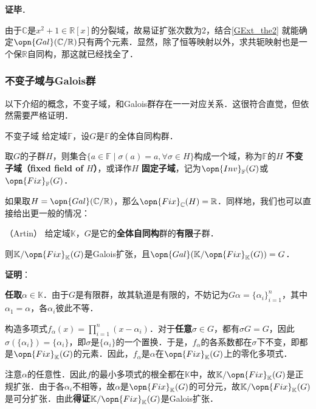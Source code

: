\textbf{证毕}．



由于$\mathbb{C}$是$x^2+1\in\mathbb{R}[x]$的分裂域，故易证扩张次数为$2$，结合\autoref{GExt_the2} 就能确定$\opn{Gal}(\mathbb{C}/\mathbb{R})$只有两个元素．显然，除了恒等映射以外，求共轭映射也是一个保$\mathbb{R}$自同构，那这就已经找全了．



\subsubsection{不变子域与Galois群}

以下介绍的概念，不变子域，和Galois群存在一一对应关系．这很符合直觉，但依然需要严格证明．



\begin{definition}{不变子域}
给定域$\mathbb{F}$，设$G$是$\mathbb{F}$的全体自同构群．

取$G$的子群$H$，则集合$\{a\in\mathbb{F}\mid \sigma(a)=a, \forall \sigma\in H\}$构成一个域，称为$\mathbb{F}$的$H$ \textbf{不变子域（fixed field of }$H$\textbf{）}，或译作$H$ \textbf{固定子域}，记为$\opn{Inv}_\mathbb{F}(G)$或$\opn{Fix}_\mathbb{F}(G)$．
\end{definition}

如果取$H=\opn{Gal}(\mathbb{C}/\mathbb{R})$，那么$\opn{Fix}_{\mathbb{C}}(H)=\mathbb{R}$．同样地，我们也可以直接给出更一般的情况：



\begin{theorem}{（Artin）}\label{GExt_the3}
给定域$\mathbb{K}$，$G$是它的\textbf{全体自同构}群的\textbf{有限}子群．

则$\mathbb{K}/\opn{Fix}_\mathbb{K}(G)$是Galois扩张，且$\opn{Gal}(\mathbb{K}/\opn{Fix}_\mathbb{K}(G))=G$．
\end{theorem}

\textbf{证明}：

\textbf{任取}$\alpha\in\mathbb{K}$．由于$G$是有限群，故其轨道是有限的，不妨记为$G\alpha=\{\alpha_i\}_{i=1}^n$，其中$\alpha_1=\alpha$，各$\alpha_i$彼此不等．

构造多项式$f_\alpha(x)=\prod_{i=1}^n(x-\alpha_i)$．对于\textbf{任意}$\sigma\in G$，都有$\sigma G=G$，因此$\sigma(\{\alpha_i\})=\{\alpha_i\}$，即$\sigma$是$\{\alpha_i\}$的一个置换．于是，$f_\alpha$的各系数都在$\sigma$下不变，即都是$\opn{Fix}_\mathbb{K}(G)$的元素．因此，$f_\alpha$是$\alpha$在$\opn{Fix}_\mathbb{K}(G)$上的零化多项式．

注意$\alpha$的任意性．因此$f$的最小多项式的根全都在$\mathbb{K}$中，故$\mathbb{K}/\opn{Fix}_\mathbb{K}(G)$是正规扩张．由于各$\alpha_i$不相等，故$\alpha$是$\opn{Fix}_\mathbb{K}(G)$的可分元，故$\mathbb{K}/\opn{Fix}_\mathbb{K}(G)$是可分扩张．由此\textbf{得证}$\mathbb{K}/\opn{Fix}_\mathbb{K}(G)$是Galois扩张．

